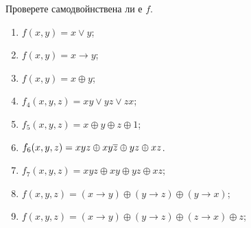 \begin{problem}
  Проверете самодвойнствена ли е $f$.
  \begin{enumerate}[1)]
  \item
    $f(x,y) = x\vee y$;
  \item
    $f(x,y) = x\rightarrow y$;
  \item
    $f(x,y) = x\oplus y$;
  \item
    $f_4(x,y,z) = xy\vee yz\vee zx$;
  \item
    $f_5(x,y,z) = x\oplus y\oplus z\oplus 1$;
  \item
    $f_6(x,y,z) = xyz\oplus xy\overline{z}\oplus yz\oplus xz$.
  \item
    $f_7(x,y,z) = xyz\oplus xy\oplus yz\oplus xz$;
  \item
    $f(x,y,z) = (x\rightarrow y)\oplus (y\rightarrow z)\oplus (y\rightarrow x)$;
  \item
    $f(x,y,z) = (x\rightarrow y)\oplus (y\rightarrow z)\oplus (z\rightarrow x)\oplus z$;
  \end{enumerate}
\end{problem}
